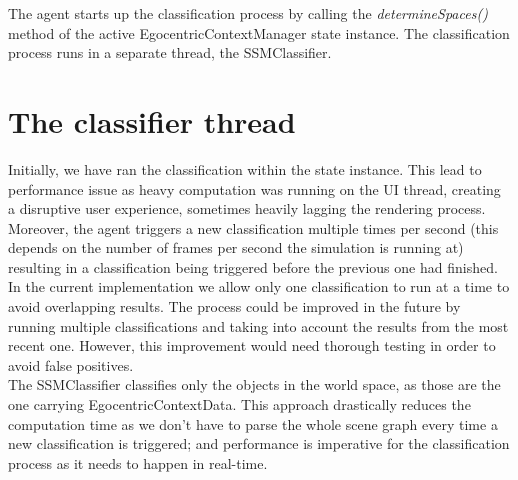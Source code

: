 The agent starts up the classification process by calling the \emph{determineSpaces()} method of the active EgocentricContextManager state instance. The classification process runs in a separate thread, the SSMClassifier.\\

\section{The classifier thread} %
\label{subsec:impl_the_classifier}
Initially, we have ran the classification within the state instance. This lead to performance issue as heavy computation was running on the UI thread, creating a disruptive user experience, sometimes heavily lagging the rendering process. Moreover, the agent triggers a new classification multiple times per second (this depends on the number of frames per second the simulation is running at) resulting in a classification being triggered before the previous one had finished. In the current implementation we allow only one classification to run at a time to avoid overlapping results. The process could be improved in the future by running multiple classifications and taking into account the results from the most recent one. However, this improvement would need thorough testing in order to avoid false positives.\\

The SSMClassifier classifies only the objects in the world space, as those are the one carrying EgocentricContextData. This approach drastically reduces the computation time as we don't have to parse the whole scene graph every time a new classification is triggered; and performance is imperative for the classification process as it needs to happen in real-time.\\

